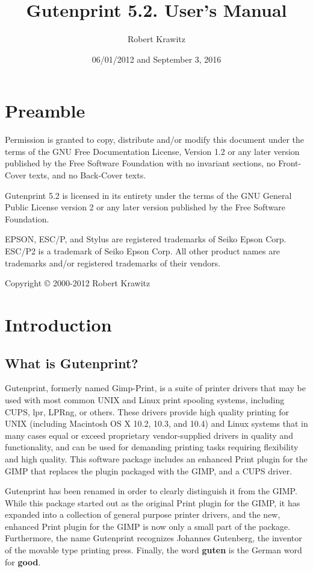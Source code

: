 \documentclass{article}[letter]
\title{Gutenprint 5.2. User's Manual}
\author{Robert Krawitz}
\date{06/01/2012 and September 3, 2016}
\begin{document}
\maketitle
\tableofcontents

\section*{Preamble}
Permission is granted to copy, distribute and/or modify this document
under the terms of the GNU Free Documentation License, Version 1.2 or
any later version published by the Free Software Foundation with no
invariant sections, no Front-Cover texts, and no Back-Cover texts.

Gutenprint 5.2 is licensed in its entirety under the terms of the GNU
General Public License version 2 or any later version published by the
Free Software Foundation.

EPSON, ESC/P, and Stylus are registered trademarks of Seiko Epson Corp.
ESC/P2 is a trademark of Seiko Epson Corp. All other product names are
trademarks and/or registered trademarks of their vendors.

Copyright © 2000-2012 Robert Krawitz

\section {Introduction}
\subsection{What is Gutenprint?}

Gutenprint, formerly named Gimp-Print, is a suite of printer drivers
that may be used with most common UNIX and Linux print spooling
systems, including CUPS, lpr, LPRng, or others. These drivers provide
high quality printing for UNIX (including Macintosh OS X 10.2, 10.3,
and 10.4) and Linux systems that in many cases equal or exceed
proprietary vendor-supplied drivers in quality and functionality, and
can be used for demanding printing tasks requiring flexibility and
high quality.  This software package includes an enhanced Print plugin
for the GIMP that replaces the plugin packaged with the GIMP, and a
CUPS driver.

Gutenprint has been renamed in order to clearly distinguish it from
the GIMP. While this package started out as the original Print plugin
for the GIMP, it has expanded into a collection of general purpose
printer drivers, and the new, enhanced Print plugin for the GIMP is
now only a small part of the package. Furthermore, the name Gutenprint
recognizes Johannes Gutenberg, the inventor of the movable type
printing press.  Finally, the word {\bf guten} is the German word for
{\bf good}.
\end{document}
